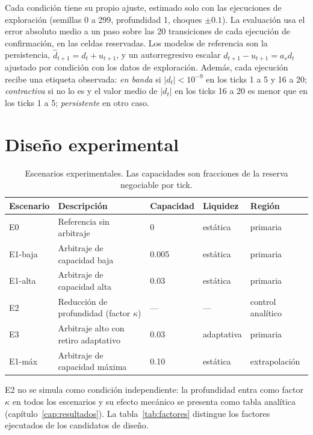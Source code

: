 Cada condición tiene su propio ajuste, estimado solo con las ejecuciones de exploración (semillas 0 a 299, profundidad 1, choques $\pm0.1$). La evaluación usa el error absoluto medio a un paso sobre las 20 transiciones de cada ejecución de confirmación, en las celdas reservadas. Los modelos de referencia son la persistencia, $\hat d_{t+1}=d_t+u_{t+1}$, y un autorregresivo escalar $d_{t+1}-u_{t+1}=a_s d_t$ ajustado por condición con los datos de exploración. Además, cada ejecución recibe una etiqueta observada: \emph{en banda} si $|d_t|<10^{-9}$ en los ticks 1 a 5 y 16 a 20; \emph{contractiva} si no lo es y el valor medio de $|d_t|$ en los ticks 16 a 20 es menor que en los ticks 1 a 5; \emph{persistente} en otro caso.

\section{Diseño experimental}

\begin{table}[htbp]
\centering
\caption{Escenarios experimentales. Las capacidades son fracciones de la reserva negociable por tick.}
\label{tab:escenarios}
\small
\begin{tabularx}{\textwidth}{@{}l >{\raggedright\arraybackslash}X l l l@{}}
\toprule
Escenario & Descripción & Capacidad & Liquidez & Región \\
\midrule
E0 & Referencia sin arbitraje & 0 & estática & primaria \\
E1-baja & Arbitraje de capacidad baja & 0.005 & estática & primaria \\
E1-alta & Arbitraje de capacidad alta & 0.03 & estática & primaria \\
E2 & Reducción de profundidad (factor $\kappa$) & --- & --- & control analítico \\
E3 & Arbitraje alto con retiro adaptativo & 0.03 & adaptativa & primaria \\
E1-máx & Arbitraje de capacidad máxima & 0.10 & estática & extrapolación \\
\bottomrule
\end{tabularx}
\end{table}

E2 no se simula como condición independiente: la profundidad entra como factor $\kappa$ en todos los escenarios y su efecto mecánico se presenta como tabla analítica (capítulo~\ref{cap:resultados}). La tabla~\ref{tab:factores} distingue los factores ejecutados de los candidatos de diseño.

